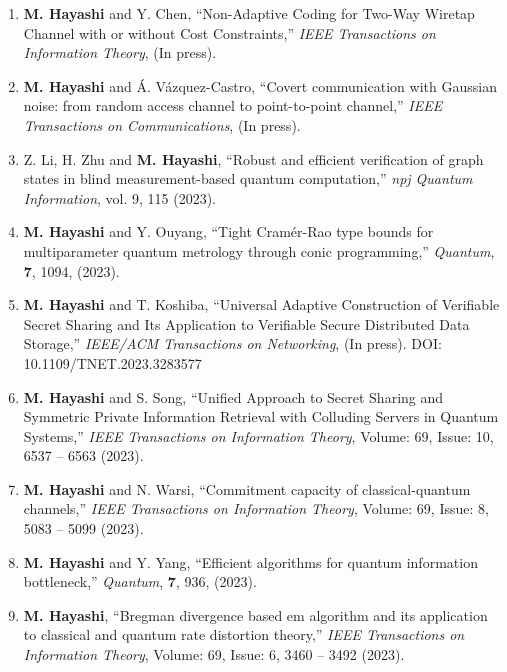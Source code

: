 \documentclass[a4paper,12pt,oneside]{article}
\begin{document}
\begin{enumerate}

\item
\textbf{M. Hayashi} and Y. Chen,
``Non-Adaptive Coding for Two-Way Wiretap Channel with or without Cost Constraints,''
{\em IEEE Transactions on Information Theory},
(In press).

\item
\textbf{M. Hayashi} and \'{A}. V\'{a}zquez-Castro,
``Covert communication with Gaussian noise: from random access channel to point-to-point channel,''
{\em IEEE Transactions on Communications},
(In press).

\item
Z. Li, H. Zhu and \textbf{M. Hayashi},
``Robust and efficient verification of graph states in blind measurement-based quantum computation,''
{\em npj Quantum Information},
vol. 9, 115 (2023).

\item
\textbf{M. Hayashi} and Y. Ouyang,
``Tight Cramér-Rao type bounds for multiparameter quantum metrology through conic programming,''
{\em Quantum},
{\bf 7}, 1094, (2023).

\item
\textbf{M. Hayashi} and T. Koshiba,
``Universal Adaptive Construction of Verifiable Secret Sharing and Its Application to Verifiable Secure Distributed Data Storage,''
{\em IEEE/ACM Transactions on Networking},
(In press).
DOI: 10.1109/TNET.2023.3283577

\item
\textbf{M. Hayashi} and S. Song,
``Unified Approach to Secret Sharing and Symmetric Private Information Retrieval with Colluding Servers in Quantum Systems,''
{\em IEEE Transactions on Information Theory},
Volume: 69, Issue: 10, 6537 – 6563 (2023).

\item
\textbf{M. Hayashi} and N. Warsi,
``Commitment capacity of classical-quantum channels,''
{\em IEEE Transactions on Information Theory},
Volume: 69, Issue: 8, 5083 – 5099 (2023).

\item
\textbf{M. Hayashi} and Y. Yang,
``Efficient algorithms for quantum information bottleneck,''
{\em Quantum},
{\bf 7}, 936, (2023).

\item
\textbf{M. Hayashi},
``Bregman divergence based em algorithm and its application to classical and quantum rate distortion theory,''
{\em IEEE Transactions on Information Theory},
Volume: 69, Issue: 6, 3460 – 3492 (2023).


\end{enumerate}
\end{document}

